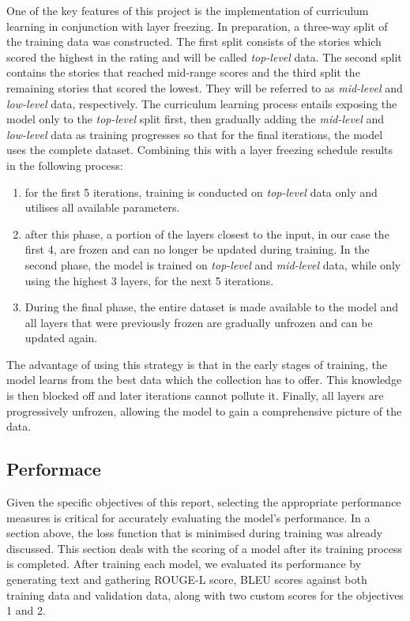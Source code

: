 \documentclass[11pt]{article}
\begin{document}
    One of the key features of this project is the implementation of curriculum learning in conjunction with layer freezing.
    In preparation, a three-way split of the training data was constructed. The first split consists of the stories which scored the highest in the rating and will be called \textit{top-level} data.
    The second split contains the stories that reached mid-range scores and the third split the remaining stories that scored the lowest. They will be referred to as \textit{mid-level} and \textit{low-level} data, respectively.
    The curriculum learning process entails exposing the model only to the \textit{top-level} split first, then gradually adding the \textit{mid-level} and \textit{low-level} data as training progresses so that for the final iterations, the model uses the complete dataset.
    Combining this with a layer freezing schedule results in the following process:
    \begin{enumerate}
        \item for the first 5 iterations, training is conducted on \textit{top-level} data only and utilises all available parameters.
        \item after this phase, a portion of the layers closest to the input, in our case the first 4, are frozen and can no longer be updated during training. In the second phase, the model is trained on \textit{top-level} and \textit{mid-level} data, while only using the highest 3 layers, for the next 5 iterations.
        \item During the final phase, the entire dataset is made available to the model and all layers that were previously frozen are gradually unfrozen and can be updated again.
    \end{enumerate}
    The advantage of using this strategy is that in the early stages of training, the model learns from the best data which the collection has to offer. This knowledge is then blocked off and later iterations cannot pollute it.
    Finally, all layers are progressively unfrozen, allowing the model to gain a comprehensive picture of the data.

    \subsection*{Performace}
    Given the specific objectives of this report, selecting the appropriate performance measures is critical for accurately evaluating the model's performance.
    In a section above, the loss function that is minimised during training was already discussed. This section deals with the scoring of a model after its training process is completed.
    After training each model, we evaluated its performance by generating text and gathering \textsc{ROUGE-L} score, \textsc{BLEU} scores against both training data and validation data, along with two custom scores for the objectives 1 and 2.
\end{document}
